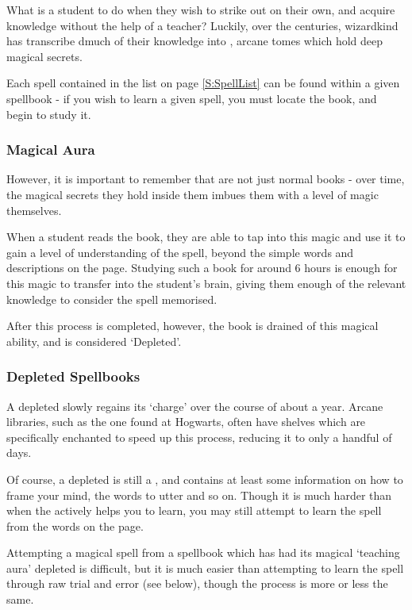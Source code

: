 What is a student to do when they wish to strike out on their own, and acquire knowledge without the help of a teacher? Luckily, over the centuries, wizardkind has transcribe dmuch of their knowledge into , arcane tomes which hold deep magical secrets. 

Each spell contained in the list on page \ref{S:SpellList} can be found within a given spellbook - if you wish to learn a given spell, you must locate the book, and begin to study it.
\subsubsection{Magical Aura}

However, it is important to remember that  are not just normal books - over time, the magical secrets they hold inside them imbues them with a level of magic themselves. 

When a student reads the book, they are able to tap into this magic and use it to gain a level of understanding of the spell, beyond the simple words and descriptions on the page. Studying such a book for around 6 hours is enough for this magic to transfer into the student's brain, giving them enough of the relevant knowledge to consider the spell memorised. 

After this process is completed, however, the book is drained of this magical ability, and is considered `Depleted'.


\subsubsection{Depleted Spellbooks}

A depleted  slowly regains its `charge' over the course of about a year. Arcane libraries, such as the one found at Hogwarts, often have shelves which are specifically enchanted to speed up this process, reducing it to only a handful of days. 

Of course, a depleted  is still a , and contains at least some information on how to frame your mind, the words to utter and so on. Though it is much harder than when the  actively helps you to learn, you may still attempt to learn the spell from the words on the page.

Attempting a magical spell from a spellbook which has had its magical `teaching aura' depleted is difficult, but it is much easier than attempting to learn the spell through raw trial and error (see below), though the process is more or less the same. 

